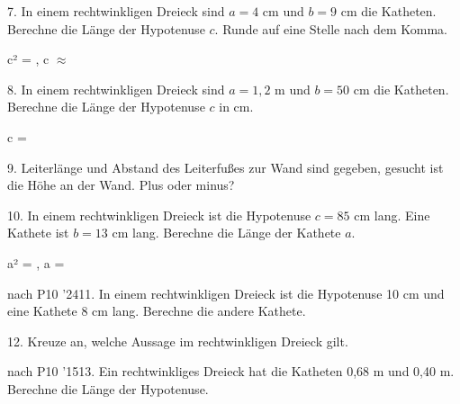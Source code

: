 \documentclass[11pt]{article}
\begin{document}
\begin{pfaufg}{}{7.}{}
In einem rechtwinkligen Dreieck sind $a = 4$ cm und $b = 9$ cm die Katheten. Berechne die Länge der Hypotenuse $c$. Runde auf eine Stelle nach dem Komma.
\par\noindent c² = \leerfeld , c $\approx$ \leerfeld[cm] \par
{}
\end{pfaufg}
\begin{pfaufg}{}{8.}{}
In einem rechtwinkligen Dreieck sind $a = 1{,}2$ m und $b = 50$ cm die Katheten. Berechne die Länge der Hypotenuse $c$ in cm.
\par\noindent c = \leerfeld[cm] \par
{}
\end{pfaufg}
\begin{pfaufg}{}{9.}{}
Leiterlänge und Abstand des Leiterfußes zur Wand sind gegeben, gesucht ist die Höhe an der Wand. Plus oder minus? 
\end{pfaufg}
\begin{pfaufg}{}{10.}{}
In einem rechtwinkligen Dreieck ist die Hypotenuse $c = 85$ cm lang. Eine Kathete ist $b = 13$ cm lang. Berechne die Länge der Kathete $a$.
\par\noindent a² = \leerfeld , a = \leerfeld[cm] \par
{}
\end{pfaufg}
\pfgruppe{}
\begin{pfaufg}{nach P10 ’24}{11.}{}
In einem rechtwinkligen Dreieck ist die Hypotenuse 10 cm und eine Kathete 8 cm lang. Berechne die andere Kathete.
\end{pfaufg}
\pfgruppe{}
\begin{pfaufg}{}{12.}{}
Kreuze an, welche Aussage im rechtwinkligen Dreieck gilt. 
\end{pfaufg}
\pfgruppe{}
\begin{pfaufg}{nach P10 ’15}{13.}{}
Ein rechtwinkliges Dreieck hat die Katheten 0,68 m und 0,40 m. Berechne die Länge der Hypotenuse.
\end{pfaufg}
\end{document}
